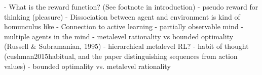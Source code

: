 \label{conclusion}


- What is the reward function? (See footnote in introduction)
- pseudo reward for thinking (pleasure)
- Dissociation between agent and environment is kind of homunculus like
- Connection to active learning
- partially observable mind
- multiple agents in the mind
- metalevel rationality vs bounded optimality (Russell \& Subramanian, 1995)
- hierarchical metalevel RL?
  - habit of thought (cushman2015habitual, and the paper distinguishing sequences from action values)
- bounded optimality vs. metalevel rationality